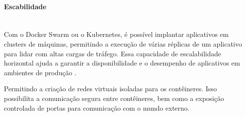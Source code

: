 \paragraph*{Escabilidade}\mbox{}\\

Com o Docker Swarm ou o Kubernetes, é possível implantar aplicativos em clusters de máquinas, permitindo a execução de várias réplicas de um aplicativo para lidar com altas cargas de tráfego. Essa capacidade de escalabilidade horizontal ajuda a garantir a disponibilidade e o desempenho de aplicativos em ambientes de produção \cite{docker-docs,docker-book,docker-aws}.

Permitindo a criação de redes virtuais isoladas para os contêineres. Isso possibilita a comunicação segura entre contêineres, bem como a exposição controlada de portas para comunicação com o mundo externo.